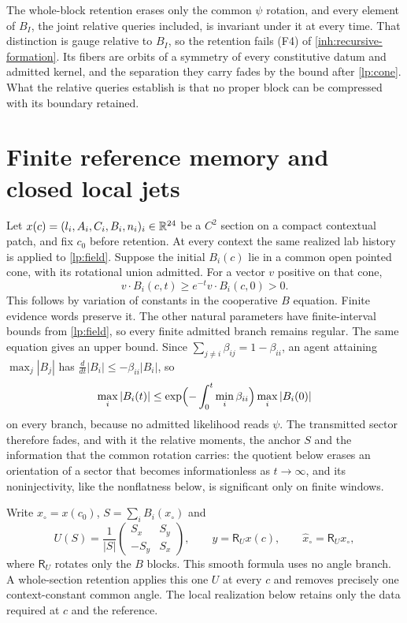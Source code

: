The whole-block retention erases only the common $\psi$ rotation, and every element of $B_I$, the joint relative queries included, is invariant under it at every time. That distinction is gauge relative to $B_I$, so the retention fails (F4) of \cref{inh:recursive-formation}. Its fibers are orbits of a symmetry of every constitutive datum and admitted kernel, and the separation they carry fades by the bound after \cref{lp:cone}. What the relative queries establish is that no proper block can be compressed with its boundary retained.

\section{Finite reference memory and closed local jets}

Let $x(c)=(l_i,A_i,C_i,B_i,n_i)_i\in\mathbb R^{24}$ be a $C^2$ section on a compact contextual patch, and fix $c_0$ before retention. At every context the same realized lab history is applied to \cref{lp:field}. Suppose the initial $B_i(c)$ lie in a common open pointed cone, with its rotational union admitted. For a vector $v$ positive on that cone,
\begin{equation}
 v\cdot B_i(c,t)\ge e^{-t}v\cdot B_i(c,0)>0.
 \label{lp:cone}
\end{equation}
This follows by variation of constants in the cooperative $B$ equation. Finite evidence words preserve it. The other natural parameters have finite-interval bounds from \cref{lp:field}, so every finite admitted branch remains regular. The same equation gives an upper bound. Since $\sum_{j\ne i}\beta_{ij}=1-\beta_{ii}$, an agent attaining $\max_j|B_j|$ has $\frac{d}{dt}|B_i|\leq-\beta_{ii}|B_i|$, so
\begin{equation}
 \max_i|B_i(t)|\leq\exp\Bigl(-\int_0^t\min_i\beta_{ii}\Bigr)\max_i|B_i(0)|
 \label{lp:decay}
\end{equation}
on every branch, because no admitted likelihood reads $\psi$. The transmitted sector therefore fades, and with it the relative moments, the anchor $S$ and the information that the common rotation carries: the quotient below erases an orientation of a sector that becomes informationless as $t\to\infty$, and its noninjectivity, like the nonflatness below, is significant only on finite windows.

Write $x_\circ=x(c_0)$, $S=\sum_i B_i(x_\circ)$ and
\begin{equation}
 U(S)=\frac1{|S|}\begin{pmatrix}S_x&S_y\\-S_y&S_x\end{pmatrix},\qquad
 y=\mathsf R_Ux(c),\qquad \widehat x_\circ=\mathsf R_Ux_\circ,
 \label{lp:retention}
\end{equation}
where $\mathsf R_U$ rotates only the $B$ blocks. This smooth formula uses no angle branch. A whole-section retention applies this one $U$ at every $c$ and removes precisely one context-constant common angle. The local realization below retains only the data required at $c$ and the reference.

